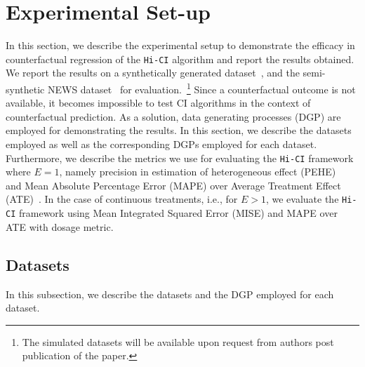 \documentclass[twoside,11pt]{article}
\begin{document}
\section{Experimental Set-up}
In this section, we describe the experimental setup to demonstrate the efficacy in counterfactual regression of the \texttt{Hi-CI} algorithm and report the results obtained. We report the results on a synthetically generated dataset~\citep{sun2015causal}, and the semi-synthetic NEWS dataset~\citep{johansson2016learning} for evaluation.~\footnote{The simulated datasets will be available upon request from authors post publication of the paper.} Since a counterfactual outcome is not available, it becomes impossible to test CI algorithms in the context of counterfactual prediction. As a solution, data generating processes (DGP) are employed for demonstrating the results. In this section, we describe the datasets employed as well as the corresponding DGPs employed for each dataset. Furthermore, we describe the metrics we use for evaluating the \texttt{Hi-CI} framework where $E = 1$, namely precision in estimation of heterogeneous effect (PEHE)~\citep{pmlr-v70-shalit17a} and  Mean Absolute Percentage Error (MAPE) over Average Treatment Effect (ATE)~\citep{sharma2019metaci}. In the case of continuous treatments, i.e., for $E > 1$, we evaluate the \texttt{Hi-CI} framework using Mean Integrated Squared Error (MISE) and MAPE over ATE with dosage metric.

\subsection{Datasets}
In this subsection, we describe the datasets and the DGP employed for each dataset. 

\end{document}
